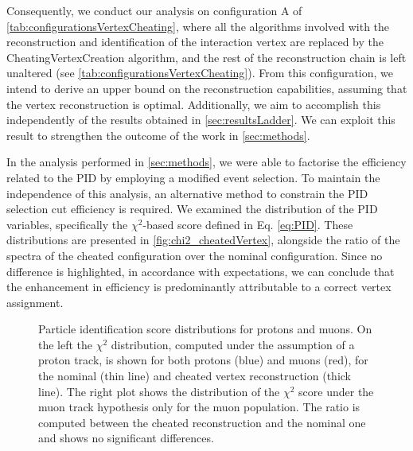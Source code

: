 Consequently, we conduct our analysis on configuration A of \autoref{tab:configurationsVertexCheating}, where all the algorithms involved with the reconstruction and identification of the interaction vertex are replaced by the CheatingVertexCreation algorithm, and the rest of the reconstruction chain is left unaltered (see \autoref{tab:configurationsVertexCheating}). 
From this configuration, we intend to derive an upper bound on the reconstruction capabilities, assuming that the vertex reconstruction is optimal. Additionally, we aim to accomplish this independently of the results obtained in \autoref{sec:resultsLadder}. We can exploit this result to strengthen the outcome of the work in \autoref{sec:methods}. 

In the analysis performed in \autoref{sec:methods}, we were able to factorise the efficiency related to the PID by employing a modified event selection. To maintain the independence of this analysis, an alternative method to constrain the PID selection cut efficiency is required. We examined the distribution of the PID variables, specifically the $\chi^2$-based score defined in Eq. \eqref{eq:PID}. These distributions are presented in \autoref{fig:chi2_cheatedVertex}, alongside the ratio of the spectra of the cheated configuration over the nominal configuration. Since no difference is highlighted, in accordance with expectations, we can conclude that the enhancement in efficiency is predominantly attributable to a correct vertex assignment. 

\begin{sidewaysfigure}
    \centering
    \caption[PID scores with the cheated vertex creation]{Particle identification score distributions for protons and muons. On the left the $\chi^2$ distribution, computed under the assumption of a proton track, is shown for both protons (blue) and muons (red), for the nominal (thin line) and cheated vertex reconstruction (thick line). The right plot shows the distribution of the $\chi^2$ score under the muon track hypothesis only for the muon population. The ratio is computed between the cheated reconstruction and the nominal one and shows no significant differences.  }
    \label{fig:chi2_cheatedVertex}
\end{sidewaysfigure}

